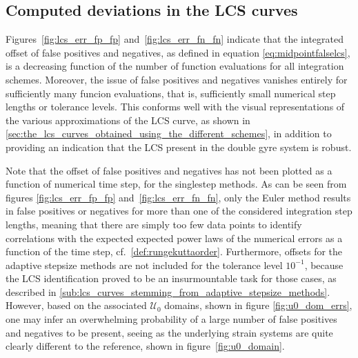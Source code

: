 \subsection{Computed deviations in the LCS curves}
\label{sub:computed_deviations_in_the_lcs_curves}

Figures~\ref{fig:lcs_err_fp_fp} and~\ref{fig:lcs_err_fn_fn} indicate that
the integrated offset of false positives and negatives, as defined in equation
\eqref{eq:midpointfalselcs}, is a decreasing function of the number of
function evaluations for all integration schemes. Moreover, the issue of false
positives and negatives vanishes entirely for sufficiently many funcion
evaluations, that is, sufficiently small numerical step lengths or tolerance
levels. This conforms well with the visual representations of the various
approximations of the LCS curve, as shown in
\cref{sec:the_lcs_curves_obtained_using_the_different_schemes}, in addition
to providing an indication that the LCS present in the double gyre system is
robust.

Note that the offset of false positives and negatives has not been plotted as a function
of numerical time step, for the singlestep methods. As can be seen from figures
\ref{fig:lcs_err_fp_fp} and~\ref{fig:lcs_err_fn_fn}, only the Euler method
results in false positives or negatives for more than one of the considered
integration step lengths, meaning that there are simply too few data points
to identify correlations with the expected expected power laws of the numerical
errors as a function of the time step, cf.~\cref{def:rungekuttaorder}.
Furthermore, offsets for the adaptive stepsize methods are not included for the
tolerance level $10^{-1}$, because the LCS identification proved to be an
insurmountable task for those cases, as described in
\cref{sub:lcs_curves_stemming_from_adaptive_stepsize_methods}. However,
based on the associated $\mathcal{U}_{0}$ domains, shown in figure
\ref{fig:u0_dom_errs}, one may infer an overwhelming probability of a large
number of false positives and negatives to be present, seeing as the underlying
strain systems are quite clearly different to the reference, shown in
figure~\ref{fig:u0_domain}.




\clearpage


